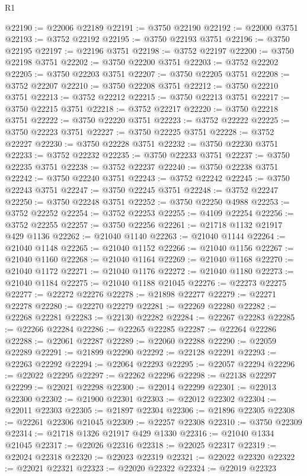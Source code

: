 \begin{lexlean}{R1}
\begin{coremodule}
@22190 := @22006 @22189
@22191 := @3750 @22190
@22192 := @22000 @3751
@22193 := @3752 @22192
@22195 := @3750 @22193 @3751
@22196 := @3750 @22195
@22197 := @22196 @3751
@22198 := @3752 @22197
@22200 := @3750 @22198 @3751
@22202 := @3750 @22200 @3751
@22203 := @3752 @22202
@22205 := @3750 @22203 @3751
@22207 := @3750 @22205 @3751
@22208 := @3752 @22207
@22210 := @3750 @22208 @3751
@22212 := @3750 @22210 @3751
@22213 := @3752 @22212
@22215 := @3750 @22213 @3751
@22217 := @3750 @22215 @3751
@22218 := @3752 @22217
@22220 := @3750 @22218 @3751
@22222 := @3750 @22220 @3751
@22223 := @3752 @22222
@22225 := @3750 @22223 @3751
@22227 := @3750 @22225 @3751
@22228 := @3752 @22227
@22230 := @3750 @22228 @3751
@22232 := @3750 @22230 @3751
@22233 := @3752 @22232
@22235 := @3750 @22233 @3751
@22237 := @3750 @22235 @3751
@22238 := @3752 @22237
@22240 := @3750 @22238 @3751
@22242 := @3750 @22240 @3751
@22243 := @3752 @22242
@22245 := @3750 @22243 @3751
@22247 := @3750 @22245 @3751
@22248 := @3752 @22247
@22250 := @3750 @22248 @3751
@22252 := @3750 @22250 @4988
@22253 := @3752 @22252
@22254 := @3752 @22253
@22255 := @4109 @22254
@22256 := @3752 @22255
@22257 := @3750 @22256
@22261 := @21718 @1132 @21917 @429 @1136
@22262 := @21040 @1140
@22263 := @21040 @1144
@22264 := @21040 @1148
@22265 := @21040 @1152
@22266 := @21040 @1156
@22267 := @21040 @1160
@22268 := @21040 @1164
@22269 := @21040 @1168
@22270 := @21040 @1172
@22271 := @21040 @1176
@22272 := @21040 @1180
@22273 := @21040 @1184
@22275 := @21040 @1188 @21045
@22276 := @22273 @22275
@22277 := @22272 @22276
@22278 := @21898 @22277
@22279 := @22271 @22278
@22280 := @22270 @22279
@22281 := @22269 @22280
@22282 := @22268 @22281
@22283 := @22130 @22282
@22284 := @22267 @22283
@22285 := @22266 @22284
@22286 := @22265 @22285
@22287 := @22264 @22286
@22288 := @22061 @22287
@22289 := @22060 @22288
@22290 := @22059 @22289
@22291 := @21899 @22290
@22292 := @22128 @22291
@22293 := @22263 @22292
@22294 := @22064 @22293
@22295 := @22057 @22294
@22296 := @22022 @22295
@22297 := @22262 @22296
@22298 := @22138 @22297
@22299 := @22021 @22298
@22300 := @22014 @22299
@22301 := @22013 @22300
@22302 := @21900 @22301
@22303 := @22012 @22302
@22304 := @22011 @22303
@22305 := @21897 @22304
@22306 := @21896 @22305
@22308 := @22261 @22306 @21045
@22309 := @22257 @22308
@22310 := @3750 @22309
@22314 := @21718 @1326 @21917 @429 @1330
@22316 := @21040 @1334 @21045
@22317 := @22026 @22316
@22318 := @22025 @22317
@22319 := @22024 @22318
@22320 := @22023 @22319
@22321 := @22022 @22320
@22322 := @22021 @22321
@22323 := @22020 @22322
@22324 := @22019 @22323

\end{coremodule}
\end{lexlean}
